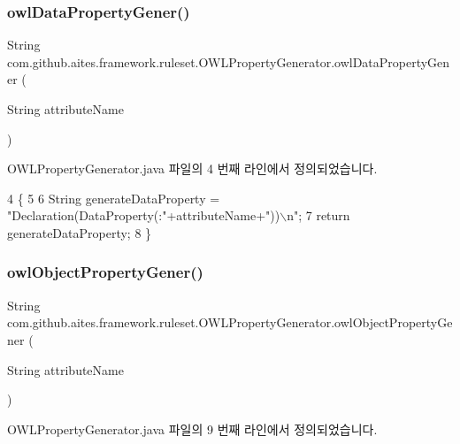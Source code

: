 \subsubsection{\texorpdfstring{owl\+Data\+Property\+Gener()}{owlDataPropertyGener()}}
{\footnotesize\ttfamily String com.\+github.\+aites.\+framework.\+ruleset.\+O\+W\+L\+Property\+Generator.\+owl\+Data\+Property\+Gener (\begin{DoxyParamCaption}\item[{String}]{attribute\+Name }\end{DoxyParamCaption})}



O\+W\+L\+Property\+Generator.\+java 파일의 4 번째 라인에서 정의되었습니다.


\begin{DoxyCode}
4                                                             \{
5         
6         String generateDataProperty = \textcolor{stringliteral}{"Declaration(DataProperty(:"}+attributeName+\textcolor{stringliteral}{"))\(\backslash\)n"};
7         \textcolor{keywordflow}{return} generateDataProperty;
8     \}
\end{DoxyCode}
\mbox{\label{classcom_1_1github_1_1aites_1_1framework_1_1ruleset_1_1_o_w_l_property_generator_a64f6c8ae732b491ab3cc26f3f432931a}} 
\subsubsection{\texorpdfstring{owl\+Object\+Property\+Gener()}{owlObjectPropertyGener()}}
{\footnotesize\ttfamily String com.\+github.\+aites.\+framework.\+ruleset.\+O\+W\+L\+Property\+Generator.\+owl\+Object\+Property\+Gener (\begin{DoxyParamCaption}\item[{String}]{attribute\+Name }\end{DoxyParamCaption})}



O\+W\+L\+Property\+Generator.\+java 파일의 9 번째 라인에서 정의되었습니다.


